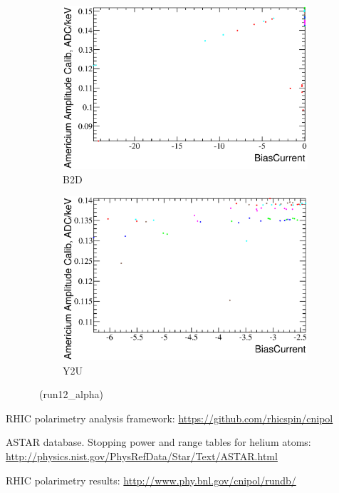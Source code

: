 \documentclass[a4paper,12pt]{article}
\begin{document}
\begin{figure}[htb]
\begin{subfigure}[t]{0.49\textwidth}
\includegraphics[width=\textwidth]{gfx/run12_alpha/B2D/c_hBiasCurrent_AmGain.eps}
\caption{B2D}
\end{subfigure}
%
\hfill
%
\begin{subfigure}[t]{0.49\textwidth}
\includegraphics[width=\textwidth]{gfx/run12_alpha/Y2U/c_hBiasCurrent_AmGain.eps}
\caption{Y2U}
\end{subfigure}
%
\caption{\bcvsgainlabel\ (run12\_alpha)}
\end{figure}


\clearpage
\begin{thebibliography}{9} %

RHIC polarimetry analysis framework: \url{https://github.com/rhicspin/cnipol}

ASTAR database. Stopping power and range tables for helium atoms:
\url{http://physics.nist.gov/PhysRefData/Star/Text/ASTAR.html}

RHIC polarimetry results: \url{http://www.phy.bnl.gov/cnipol/rundb/}

\end{thebibliography}
\end{document}
